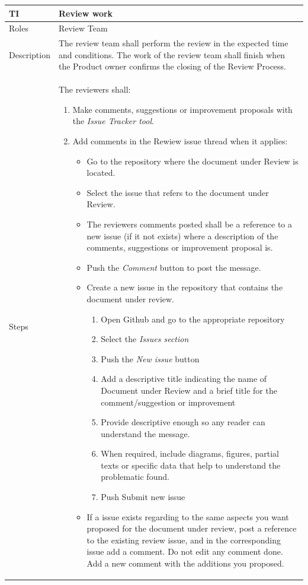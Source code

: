 \documentclass{template/openetcs_article}
\begin{document}
\begin{flushleft}
\tablefirsthead{}
\tablehead{}
\tabletail{}
\tablelasttail{}
\begin{supertabular}{|m{2cm}|m{13cm}|}
\hline
{}
TI & 
Review work
\\\hline
Roles &
Review Team
\\\hline
Description &
The review team shall perform the review in the expected time and conditions. The work of the review team shall finish when the Product owner confirms the closing of the Review Process.
\\\hline
Steps &
The reviewers shall:
\begin{enumerate}
\item Make comments, suggestions or improvement proposals with the {\it Issue Tracker tool}.
\item Add comments in the Rewiew issue thread when it applies:
\begin{itemize}
\item Go to the repository where the document under Review is located.
\item Select the issue that refers to the document under Review.
\item The reviewers comments posted shall be a reference to a new issue (if it not exists) where a description of the comments, suggestions or improvement proposal is.
\item Push the {\it Comment} button to post the message.
\item Create a new issue in the repository that contains the document under review. 
\begin{enumerate}
\item Open Github and go to the appropriate repository
\item Select the {\it Issues section}
\item Push the {\it New issue} button
\item Add a descriptive title indicating the name of Document under Review and a brief title for the comment/suggestion or improvement
\item Provide descriptive enough so any reader can understand the message.
\item When required, include diagrams, figures, partial texts or specific data that help to understand the problematic found.
\item Push Submit new issue
\end{enumerate}
\item If a issue exists regarding to the same aspects you want proposed for the document under review, post a reference to the existing review issue, and in the corresponding issue add a comment. Do not edit any comment done. Add a new comment with the additions you proposed.

\end{itemize}
\end{enumerate}
\end{supertabular}
\end{flushleft}
\end{document}
